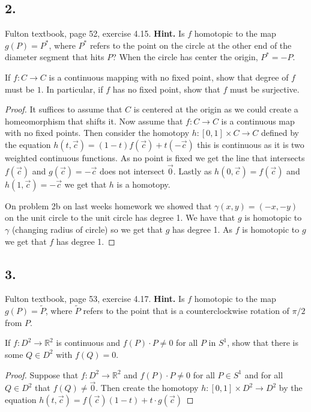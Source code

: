 \documentclass{amsart}
\theoremstyle{plain}
\theoremstyle{definition}
\theoremstyle{remark}
\begin{document}
\vspace{.15in}
\noindent
\subsection*{2.} Fulton textbook, page 52, exercise 4.15. {\bf  Hint.} Is $f$ homotopic to the map $g(P) = P^*$, where $P^*$ refers to the point on the circle at the other end of the diameter segment that hits $P$? When the circle has center the origin, $P^* = -P$. 

If $f:C\to C$  is a continuous mapping with no fixed point, show that degree of $f$ must be $1$. In particular, if $f$ has no fixed point, show that $f$ must be surjective. 

\begin{proof}
    It suffices to assume that $C$ is centered at the origin as we could create a homeomorphism that shifts it. Now assume that $f:C\to C$ is a continuous map with no fixed points. Then consider the homotopy $h:[0,1]\times C\to C$ defined by the equation $h(t,\vec c)=(1-t)f(\vec c)+t(-\vec c)$ this is continuous as it is two weighted continuous functions. As no point is fixed we get the line that intersects $f(\vec c)$ and $g(\vec c)=-\vec c$ does not intersect $\vec 0$. Lastly as $h(0,\vec c)=f(\vec c)$ and $h(1,\vec c)=-\vec c$ we get that $h$ is a homotopy. 
    
    On problem 2b on last weeks homework we showed that $\gamma(x,y)=(-x,-y)$ on the unit circle to the unit circle has degree 1. We have that $g$ is homotopic to $\gamma$ (changing radius of circle) so we get that $g$ has degree 1. As $f$ is homotopic to $g$ we get that $f$ has degree 1.

\end{proof}


\vspace{.15in}
\noindent
\subsection*{3.} Fulton textbook, page 53, exercise 4.17. {\bf  Hint.} Is $f$ homotopic to the map $g(P) = \widetilde{P}$, where $\widetilde{P}$ refers to the point that is a counterclockwise rotation of $\pi /2$ from $P$. 

If $f:D^2\to \mathbb{R}^2$ is continuous and $f(P)\cdot P\not = 0$ for all $P$ in $S^1$, show that there is some $Q\in D^2$ with $f(Q)=0$.

\begin{proof}
    Suppose that $f:D^2 \to \mathbb R^2 $ and $f(P)\cdot P\not = 0$ for all $P\in S^1$ and for all $Q\in D^2$ that $f(Q)\not = \vec 0$. 
    Then create the homotopy $h:[0,1]\times D^2\to D^2$ by the equation $h(t,\vec c)=f(\vec c)(1-t)+t\cdot g(\vec c)$


\end{proof}
\end{document}

